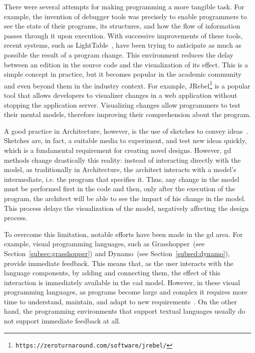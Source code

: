 There were several attempts for making programming a more tangible task. For example, the invention of debugger tools was precisely to enable programmers to see the state of their programs, its structures, and how the flow of information passes through it upon execution. With successive improvements of these tools, recent systems, such as LightTable~\citep{lighttable}, have been trying to anticipate as much as possible the result of a program change. This environment reduces the delay between an edition in the source code and the visualization of its effect. This is a simple concept in practice, but it becomes popular in the academic community and even beyond them in the industry context. For example, JRebel\footnote{\texttt{https://zeroturnaround.com/software/jrebel/}} is a popular tool that allows developers to visualizer changes in a web application without stopping the application server. Visualizing changes allow programmers to test their mental models, therefore improving their comprehension about the program.

A good practice in Architecture, however, is the use of sketches to convey ideas~\citep{do2001thinking}. Sketches are, in fact, a suitable media to experiment, and test new ideas quickly, which is a fundamental requirement for creating novel designs. However, \gls{gd} methods change drastically this reality: instead of interacting directly with the model, as traditionally in Architecture, the architect interacts with a model's intermediate, i.e. the program that specifies it. Thus, any change in the model must be performed first in the code and then, only after the execution of the program, the architect will be able to see the impact of his change in the model. This process delays the visualization of the model, negatively affecting the design process.

To overcome this limitation, notable efforts have been made in the \gls{gd} area. For example, visual programming languages, such as Grasshopper~(see Section~\ref{subsec:grasshopper}) and Dynamo~(see Section~\ref{subsed:dynamo}), provide immediate feedback. This means that, as the user interacts with the language components, by adding and connecting them, the effect of this interaction is immediately available in the \gls{cad} model. However, in these visual programming languages, as programs become large and complex it requires more time to understand, maintain, and adapt to new requirements~\citep{leitao2011programming}. On the other hand, the programming environments that support textual languages usually do not support immediate feedback at all.

